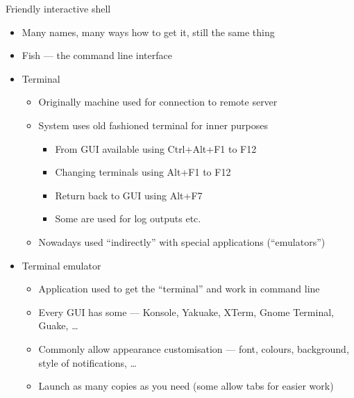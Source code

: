 \documentclass[hyperref={bookmarks=true, unicode=true, colorlinks=true, pdftitle={Linux, command line and MetaCentrum}, plainpages=false, pdfauthor={Vojtech Zeisek}, pdfsubject={Course about use of Linux command line, writing shell scripts and using MetaCentrum of CESNET}, pdfcreator={XeLaTeX, http://www.xelatex.org/}, pdfkeywords={Linux, GNU, BASH, shell, command line, MetaCentrum}, linkcolor=Sienna, anchorcolor=black, citecolor=green, filecolor=magenta, menucolor=Sienna, urlcolor=cyan, pdftex}, compress, ucs, xelatex, xcolor=svgnames, 11pt]{beamer}
\begin{document}
\begin{frame}{Friendly interactive shell}
\begin{itemize}
  \item Many names, many ways how to get it, still the same thing
  \item Fish --- the command line interface
  \item Terminal
  \begin{itemize}
    \item Originally machine used for connection to remote server
    \item System uses old fashioned terminal for inner purposes
    \begin{itemize}
      \item From GUI available using Ctrl+Alt+F1 to F12
      \item Changing terminals using Alt+F1 to F12
      \item Return back to GUI using Alt+F7
      \item Some are used for log outputs etc.
    \end{itemize}
    \item Nowadays used ``indirectly'' with special applications (``emulators'')
  \end{itemize}
  \item Terminal emulator
  \begin{itemize}
    \item Application used to get the ``terminal'' and work in command line
    \item Every GUI has some --- Konsole, Yakuake, XTerm, Gnome Terminal, Guake, \ldots
    \item Commonly allow appearance customisation --- font, colours, background, style of notifications, \ldots
    \item Launch as many copies as you need (some allow tabs for easier work)
  \end{itemize}
\end{itemize}
\end{frame}
\end{document}
